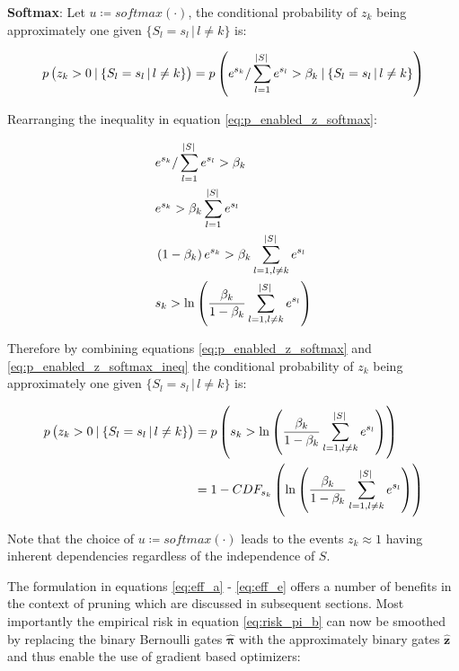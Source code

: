 \documentclass[final,1p,times]{elsarticle}
\begin{document}
\textbf{Softmax}: Let $u \coloneqq softmax(\cdot)$, the conditional probability of $z_k$ being approximately one given $\{S_l=s_l \, | \, l \neq k\}$ is:

\begin{align}
p \left(z_k > 0 \: | \:  \{S_l=s_l \, | \, l \neq k\} \right) = p \left( e^{s_k} / \sum_{l = 1}^{\abs{S}} e^{s_l} > \beta_k  \: | \:  \{S_l=s_l \, | \, l \neq k\} \right) \label{eq:p_enabled_z_softmax}
\end{align}

Rearranging the inequality in equation \eqref{eq:p_enabled_z_softmax}:

\begin{align}
& e^{s_k} / \sum_{l = 1}^{\abs{S}} e^{s_l} > \beta_k \\ 
& e^{s_k} > \beta_k \sum_{l = 1}^{\abs{S}} e^{s_l} \\
& \left( 1 - \beta_k \right) e^{s_k} > \beta_k \sum_{l = 1, l \neq k}^{\abs{S}} e^{s_l}  \\
& s_k > \ln \left( \frac{\beta_k}{1 - \beta_k} \sum_{l = 1, l \neq k}^{\abs{S}} e^{s_l} \right) \label{eq:p_enabled_z_softmax_ineq}
\end{align}

Therefore by combining equations \eqref{eq:p_enabled_z_softmax} and \eqref{eq:p_enabled_z_softmax_ineq} the conditional probability of $z_k$ being approximately one given $\{S_l=s_l \, | \, l \neq k\}$ is:

\begin{align}
p \left(z_k > 0 \: | \:  \{S_l=s_l \, | \, l \neq k\} \right) & = p \left( s_k > \ln \left( \frac{\beta_k}{1 - \beta_k} \sum_{l = 1, l \neq k}^{\abs{S}} e^{s_l} \right) \right) \\
& = 1 - CDF_{s_k} \left( \ln \left( \frac{\beta_k}{1 - \beta_k} \sum_{l = 1, l \neq k}^{\abs{S}} e^{s_l} \right) \right)
\end{align}

Note that the choice of $u \coloneqq softmax ( \cdot) $ leads to the events $z_k \approx 1$ having inherent dependencies regardless of the independence of $S$. \newline

The formulation in equations \eqref{eq:eff_a} - \eqref{eq:eff_e} offers a number of benefits in the context of pruning which are discussed in subsequent sections. Most importantly the empirical risk in equation \eqref{eq:risk_pi_b} can now be smoothed by replacing the binary Bernoulli gates $\hat{\boldsymbol{\pi}}$ with the approximately binary gates $\hat{\mathbf{z}}$ and thus enable the use of gradient based optimizers:
\end{document}
